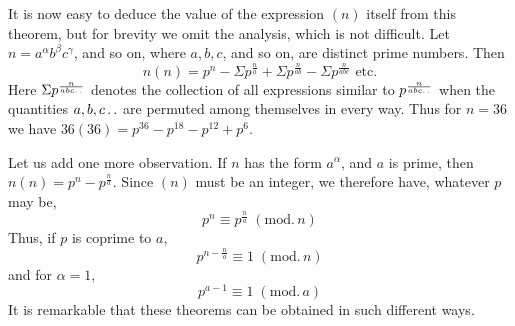 It is now easy to deduce the value of the expression $(n)$ itself from this theorem, but for brevity we omit the analysis, which is not difficult. Let $n=a^\alpha b^\beta c^\gamma$, and so on, where $a,b,c$, and so on, are distinct prime numbers. Then
\[
n(n)=p^n-\Sigma p^{\frac na}+\Sigma p^{\frac n{ab}}-\Sigma p^{\frac n{abc}}\text{ etc.}
\]
Here $\Sigma p^{\frac n{abc\mathinner{.\,.}}}$ denotes the collection of all expressions similar to $p^{\frac n{abc\mathinner{.\,.}}}$ when the quantities $a,b,c\mathinner{.\,.}$ are permuted among themselves in every way. Thus for $n=36$ we have $36(36)=p^{36}-p^{18}-p^{12}+p^6$.

Let us add one more observation. If $n$ has the form $a^\alpha$, and $a$ is prime, then $n(n)=p^n-p^{\frac na}$. Since $(n)$ must be an integer, we therefore have, whatever $p$ may be,
\[
p^n\equiv p^{\frac na}\;(\mathrm{mod.}\,n)
\]
Thus, if $p$ is coprime to $a$,
\[
p^{n-\frac na}\equiv1\;(\mathrm{mod.}\,n)
\]
and for $\alpha=1$,
\[
p^{a-1}\equiv1\;(\mathrm{mod.}\,a)
\]
It is remarkable that these theorems can be obtained in such different ways.
